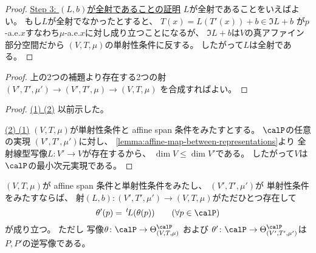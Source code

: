 \documentclass[report]{jlreq}
\begin{document}
\begin{proof}
    \uline{Step 3: $(L, b)$が全射であることの証明} \quad
    $L$が全射であることをいえばよい。
    もし$L$が全射でなかったとすると、
    $T(x) = L(T'(x)) + b \in \Im L + b$
    が$p$-a.e.$x$すなわち$\mu$-a.e.$x$に対し成り立つことになるが、
    $\Im L + b$は$V$の真アファイン部分空間だから
    $(V, T, \mu)$の単射性条件に反する。
    したがって$L$は全射である。
\end{proof}


\begin{proof}
    上の2つの補題より存在する2つの射
    $(V', T', \mu') \to (V', T', \mu) \to (V, T, \mu)$
    を合成すればよい。
\end{proof}


\begin{proof}
    \uline{(1) \Rightarrow (2)} \quad
    以前示した。

    \uline{(2) \Rightarrow (1)} \quad
    $(V, T, \mu)$が単射性条件と affine span 条件をみたすとする。
    $\calP$の任意の実現
    $(V', T', \mu')$に対し、
    \cref{lemma:affine-map-between-representations}より
    全射線型写像$L: V' \to V$が存在するから、
    $\dim V \le \dim V'$である。
    したがって$V$は$\calP$の最小次元実現である。
\end{proof}

\begin{lemma}[自然パラメータの変換]
    $(V, T, \mu)$が
    affine span 条件と単射性条件をみたし、
    $(V', T', \mu')$が
    単射性条件をみたすならば、
    射$(L, b) \colon (V', T', \mu') \to (V, T, \mu)$がただひとつ存在して
    \begin{equation}
        \theta'(p)
            = \up{t}L(\theta(p))
            \qquad
            (\forall p \in \calP)
    \end{equation}
    が成り立つ。
    ただし
    写像$\theta \colon \calP \to \Theta^\calP_{(V, T, \mu)}$
    および
    $\theta' \colon \calP \to \Theta^\calP_{(V', T', \mu')}$は
    $P, P'$の逆写像である。
\end{lemma}
\end{document}
